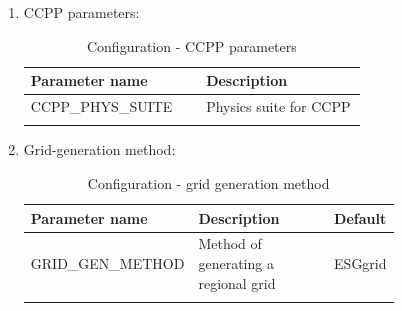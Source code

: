 \documentclass[11pt,fleqn]{report}              %
\begin{document}
\begin{enumerate}
\item CCPP parameters:
{
\scriptsize
\begin{longtable}{ p{0.3\linewidth} | p{0.4\linewidth} }
\hline
\hline
Parameter name & Description \\
\hline
CCPP\_PHYS\_SUITE &  Physics suite for CCPP \\
\hline
\caption{Configuration - CCPP parameters }
\label{table:config_ccpp_parm}
\end{longtable}
}

\item Grid-generation method:
{
\scriptsize
\begin{longtable}{p{0.25\linewidth} | p{0.4\linewidth} | p{0.12\linewidth}}
\hline
\hline
Parameter name & Description & Default \\
\hline
GRID\_GEN\_METHOD & Method of generating a regional grid & ESGgrid \\
\hline
\caption{Configuration - grid generation method}
\label{table:config_gridgen}
\end{longtable}
}


\end{enumerate}
\end{document}
